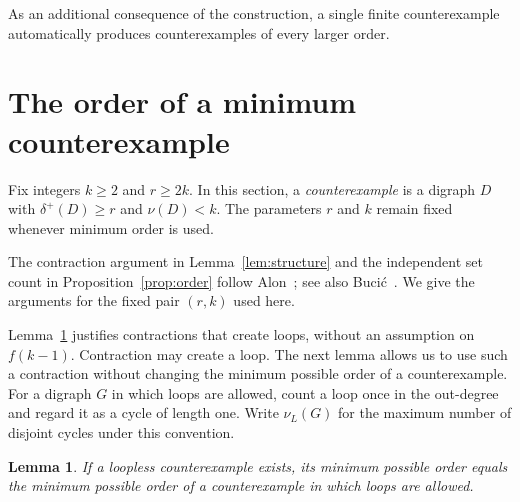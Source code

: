 \documentclass[a4paper,12pt]{article}
\newtheorem{lemma}[theorem]{Lemma}
\numberwithin{equation}{section}
\begin{document}
As an additional consequence of the construction, a single finite counterexample automatically produces counterexamples of every larger order. %


\section{The order of a minimum counterexample}\label{sec:order}


Fix integers $k\ge2$ and $r\ge2k$. In this section, a \textit{counterexample} is
a digraph $D$ with $\delta^+(D)\ge r$ and $\nu(D)<k$. The parameters
$r$ and $k$ remain fixed whenever minimum order is used.


The contraction argument in Lemma~\ref{lem:structure} and the
independent set count in Proposition~\ref{prop:order} follow
Alon~\cite[Claims~1 and~2]{alonJCTB68}; see also
Buci\'c~\cite[Propositions~3.1 and~3.2]{bucicDM341}.
We give the arguments for the fixed pair $(r,k)$ used here. 


Lemma~\ref{lem:loops} justifies contractions that create loops,
without an assumption on $f(k-1)$.
Contraction may create a loop. The next lemma allows us to use such a
contraction without changing the minimum possible order of a
counterexample. For a digraph $G$ in which loops are allowed, count a
loop once in the out-degree and regard it as a cycle of length one.
Write $\nu_L(G)$ for the maximum number of disjoint cycles under
this convention.


\begin{lemma}\label{lem:loops}
If a loopless counterexample exists, its minimum possible order equals
the minimum possible order of a counterexample in which loops are
allowed.
\end{lemma}
\end{document}
